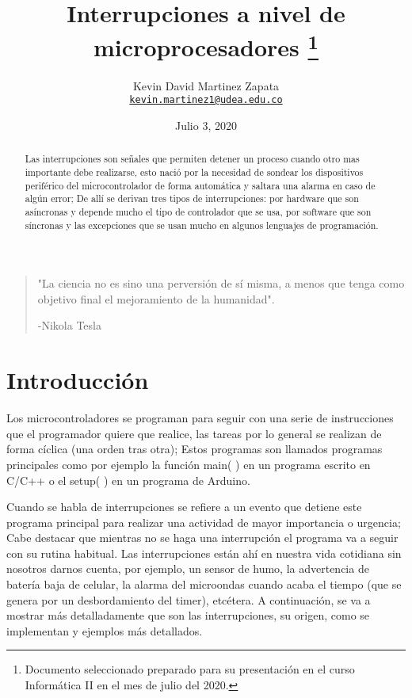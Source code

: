 \documentclass[11pt]{article}
\title{Interrupciones a nivel de microprocesadores
\thanks{Documento seleccionado preparado para su presentación en el curso Informática II en el mes de julio del 2020.}
}
\author{Kevin David Martinez Zapata\\%
    \href{mailto:kevin.martinez1@udea.edu.co}{\texttt{kevin.martinez1@udea.edu.co}}
    }
\date{Julio 3, 2020}
\begin{document}
\maketitle

\begin{quote}
"La ciencia no es sino una perversión de sí misma, a menos que tenga como objetivo final el mejoramiento de la humanidad".

-Nikola Tesla
\end{quote}

\begin{abstract}
Las interrupciones son señales que permiten detener un proceso cuando otro mas importante debe realizarse, esto nació por la necesidad de sondear los dispositivos periférico del microcontrolador de forma automática y saltara una alarma en caso de algún error; De allí se derivan tres tipos de interrupciones: por hardware que son asíncronas y depende mucho el tipo de controlador que se usa, por software que son síncronas y las excepciones que se usan mucho en algunos lenguajes de programación.
\end{abstract}

\section{Introducción}
Los microcontroladores se programan para seguir con una serie de instrucciones que el programador quiere que realice, las tareas por lo general se realizan de forma cíclica (una orden tras otra); Estos programas son llamados programas principales como por ejemplo la función main( ) en un programa escrito en C/C++ o el setup( ) en un programa de Arduino.

Cuando se habla de interrupciones se refiere a un evento que detiene este programa principal para realizar una actividad de mayor importancia o urgencia; Cabe destacar que mientras no se haga una interrupción el programa va a seguir con su rutina habitual. Las interrupciones están ahí en nuestra vida cotidiana sin nosotros darnos cuenta, por ejemplo, un sensor de humo, la advertencia de batería baja de celular, la alarma del microondas cuando acaba el tiempo (que se genera por un desbordamiento del timer), etcétera. A continuación, se va a mostrar más detalladamente que son las interrupciones, su origen, como se implementan y ejemplos más detallados.
\cite{interrupciones2}
\end{document}
